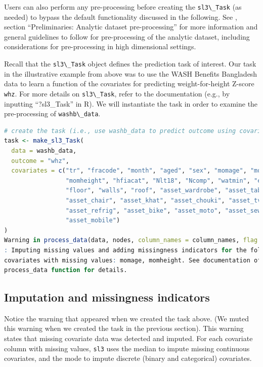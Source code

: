 \documentclass[
  12pt, krantz2,
]{krantz}
\newcommand{\passthrough}[1]{#1}
\newcommand{\1}{\mathbbm{1}}
\theoremstyle{definition}
\theoremstyle{definition}
\theoremstyle{definition}
\theoremstyle{definition}
\theoremstyle{remark}
\begin{document}
Users can also perform any pre-processing before creating the \passthrough{\lstinline!sl3\_Task!}
(as needed) to bypass the default functionality discussed in the following.
See \citet{rvp2022super}, section ``Preliminaries: Analytic dataset pre-processing''
for more information and general guidelines to follow for pre-processing of the
analytic dataset, including considerations for pre-processing in high
dimensional settings.

Recall that the \passthrough{\lstinline!sl3\_Task!} object defines the prediction task of interest. Our
task in the illustrative example from above was to use the WASH Benefits
Bangladesh data to learn a function of the covariates for predicting
weight-for-height Z-score \passthrough{\lstinline!whz!}. For more details on \passthrough{\lstinline!sl3\_Task!}, refer to the
documentation (e.g., by inputting ``?sl3\_Task'' in R). We will instantiate the
task in order to examine the pre-processing of \passthrough{\lstinline!washb\_data!}.

\begin{lstlisting}[language=R]
# create the task (i.e., use washb_data to predict outcome using covariates)
task <- make_sl3_Task(
  data = washb_data,
  outcome = "whz",
  covariates = c("tr", "fracode", "month", "aged", "sex", "momage", "momedu", 
                 "momheight", "hfiacat", "Nlt18", "Ncomp", "watmin", "elec", 
                 "floor", "walls", "roof", "asset_wardrobe", "asset_table", 
                 "asset_chair", "asset_khat", "asset_chouki", "asset_tv", 
                 "asset_refrig", "asset_bike", "asset_moto", "asset_sewmach", 
                 "asset_mobile")
)
Warning in process_data(data, nodes, column_names = column_names, flag = flag,
: Imputing missing values and adding missingness indicators for the following
covariates with missing values: momage, momheight. See documentation of the
process_data function for details.
\end{lstlisting}

\hypertarget{imputation-and-missingness-indicators}{%
\subsection{Imputation and missingness indicators}\label{imputation-and-missingness-indicators}}

Notice the warning that appeared when we created the task above. (We muted this
warning when we created the task in the previous section). This warning states
that missing covariate data was detected and imputed. For each covariate column
with missing values, \passthrough{\lstinline!sl3!} uses the median to impute missing continuous
covariates, and the mode to impute discrete (binary and categorical) covariates.
\end{document}
